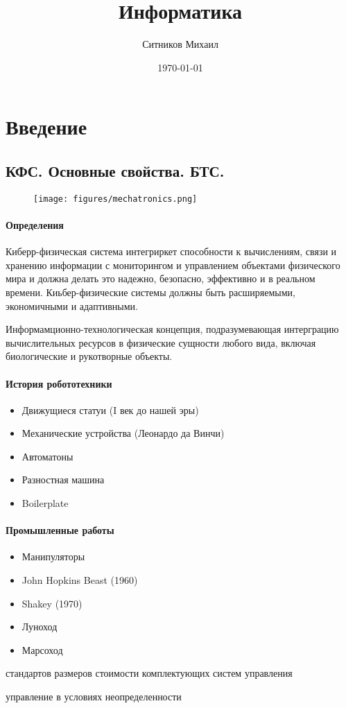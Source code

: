 \documentclass[a4paper]{article}
\title{Информатика}
\author{Ситников Михаил}
\date{\today}
\begin{document}
\maketitle
\section{Введение}
\subsection{КФС. Основные свойства. БТС.}
\begin{figure}[htpb]
  \centering
  \texttt{[image: figures/mechatronics.png]}
  \caption{}
  \label{fig:}
\end{figure}
\paragraph{Определения}
\par
Киберр-физическая система интегриркет способности к вычислениям, связи и хранению информации с мониторингом и управлением объектами физического мира и должна делать это надежно, безопасно, эффективно и в реальном времени. Киьбер-физические системы должны быть расширяемыми, экономичными и адаптивными.
\par
Информамционно-технологическая концепция, подразумевающая интерграцию вычислительных ресурсов в физические сущности любого вида, включая биологические и рукотворные объекты.
\paragraph{История робототехники}
\begin{itemize}
  \item Движущиеся статуи (I век до нашей эры)
  \item Механические устройства (Леонардо да Винчи)
  \item Автоматоны
  \item Разностная машина
  \item Boilerplate 
\end{itemize}
\paragraph{Промышленные работы}
\begin{itemize}
  \item Манипуляторы 
  \item John Hopkins Beast (1960)
  \item Shakey (1970)
  \item Луноход
  \item Марсоход
\end{itemize}
\begin{itemize}
   стандартов
   размеров
   стоимости комплектующих
   систем управления
  \begin{itemize}
     управление
     в условиях неопределенности
  \end{itemize}
\end{itemize}
\end{document}
